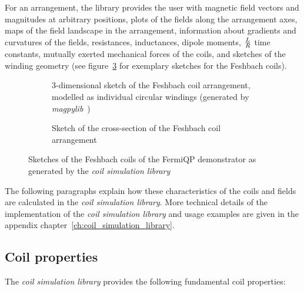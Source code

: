 For an arrangement, the library provides the user with magnetic field vectors and magnitudes at arbitrary positions, plots of the fields along the arrangement axes, maps of the field landscape in the arrangement, information about gradients and curvatures of the fields, resistances, inductances, dipole moments, $L\over R$ time constants, mutually exerted mechanical forces of the coils, and sketches of the winding geometry (see figure~\ref{fig:csl_sketches} for exemplary sketches for the Feshbach coils).

\begin{figure}
    \centering
    \begin{subfigure}[t]{0.47\textwidth}
        \centering
        \resizebox{\textwidth}{!}{
            \begin{pgfpicture}
                \pgftext{}
            \end{pgfpicture}
        }
        \caption{3-dimensional sketch of the Feshbach coil arrangement, modelled as individual circular windings (generated by \textit{magpylib}~\cite{noauthor_magpylibmagpylib_nodate})}
        \label{fig:csl_sketches_3d}
    \end{subfigure}
    \hspace{0.04\textwidth}
    \begin{subfigure}[t]{0.47\textwidth}
        \centering
        \resizebox{\textwidth}{!}{
            \begin{pgfpicture}
                \pgftext{}
            \end{pgfpicture}
        }
        \caption{Sketch of the cross-section of the Feshbach coil arrangement}
        \label{fig:csl_sketches_cross_section}
    \end{subfigure}
    \caption{Sketches of the Feshbach coils of the FermiQP demonstrator as generated by the \textit{coil simulation library}}
    \label{fig:csl_sketches}
\end{figure}

The following paragraphs explain how these characteristics of the coils and fields are calculated in the \textit{coil simulation library}. More technical details of the implementation of the \textit{coil simulation library} and usage examples are given in the appendix chapter~\ref{ch:coil_simulation_library}. 

\subsection*{Coil properties}
The \textit{coil simulation library} provides the following fundamental coil properties:
